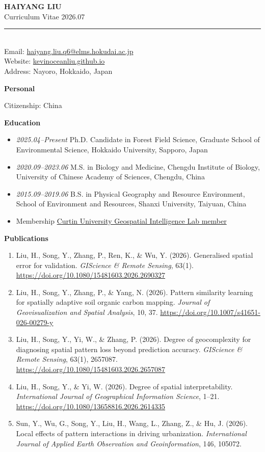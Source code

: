 \documentclass[10.5pt,a4paper]{article}
\newcommand{\cvitem}[2]{#1 #2\par}
\newcommand{\publication}[2]{\item[#1.] #2}
\newcommand{\cvsection}[1]{\par\vspace{1.1em}\textbf{#1}\par\vspace{0.45em}}
\begin{document}
{\LARGE\bfseries HAIYANG LIU}\\[0.25em]
Curriculum Vitae \textbar{} 2026.07\\[0.5em]
\rule{\textwidth}{0.4pt}\\[0.8em]
Email: \href{mailto:haiyang.liu.q6@elms.hokudai.ac.jp}{haiyang.liu.q6@elms.hokudai.ac.jp}\\
Website: \href{https://kevinoceanliu.github.io}{kevinoceanliu.github.io}\\
Address: Nayoro, Hokkaido, Japan

\cvsection{Personal}
\cvitem{Citizenship:}{China}

\cvsection{Education}
\begin{itemize}
  \item \textit{2025.04--Present} \quad Ph.D. Candidate in Forest Field Science, Graduate School of Environmental Science, Hokkaido University, Sapporo, Japan
  \item \textit{2020.09--2023.06} \quad M.S. in Biology and Medicine, Chengdu Institute of Biology, University of Chinese Academy of Sciences, Chengdu, China
  \item \textit{2015.09--2019.06} \quad B.S. in Physical Geography and Resource Environment, School of Environment and Resources, Shanxi University, Taiyuan, China
  \item Membership \quad \href{https://yongzesong.com/lab.html}{Curtin University Geospatial Intelligence Lab member}
\end{itemize}

\cvsection{Publications}
\begin{enumerate}
  \publication{5}{Liu, H., Song, Y., Zhang, P., Ren, K., \& Wu, Y. (2026). Generalised spatial error for validation. \textit{GIScience \& Remote Sensing}, 63(1). \href{https://doi.org/10.1080/15481603.2026.2690327}{https://doi.org/10.1080/15481603.2026.2690327}}
  \publication{4}{Liu, H., Song, Y., Zhang, P., \& Yang, N. (2026). Pattern similarity learning for spatially adaptive soil organic carbon mapping. \textit{Journal of Geovisualization and Spatial Analysis}, 10, 37. \href{https://doi.org/10.1007/s41651-026-00279-y}{https://doi.org/10.1007/s41651-026-00279-y}}
  \publication{3}{Liu, H., Song, Y., Yi, W., \& Zhang, P. (2026). Degree of geocomplexity for diagnosing spatial pattern loss beyond prediction accuracy. \textit{GIScience \& Remote Sensing}, 63(1), 2657087. \href{https://doi.org/10.1080/15481603.2026.2657087}{https://doi.org/10.1080/15481603.2026.2657087}}
  \publication{2}{Liu, H., Song, Y., \& Yi, W. (2026). Degree of spatial interpretability. \textit{International Journal of Geographical Information Science}, 1--21. \href{https://doi.org/10.1080/13658816.2026.2614335}{https://doi.org/10.1080/13658816.2026.2614335}}
  \publication{1}{Sun, Y., Wu, G., Song, Y., Liu, H., Wang, L., Zhang, Z., \& Hu, J. (2026). Local effects of pattern interactions in driving urbanization. \textit{International Journal of Applied Earth Observation and Geoinformation}, 146, 105072.}
\end{enumerate}
\end{document}
